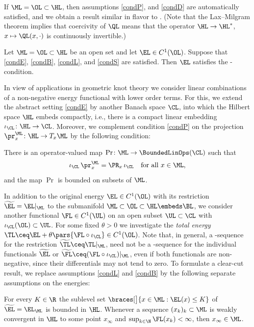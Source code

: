 If $\ML= \OL \subset \HL$,
then assumptions \ref{condP}, and \ref{condD} are automatically satisfied, and we obtain a result similar in flavor to \cite[Chapter~II, Proposition 2.2]{struwe_2008a}. 
(Note that the Lax--Milgram theorem implies that coercivity of $\QL$ means that the operator $\HL \to \HL^*$, $x \mapsto \QL(x,\cdot)$ is continuously invertible.)

\begin{corollary}
\label{cor:PS-open-set}
Let $\ML=\OL \subset \HL$ be an open set and let $\EL\in C^1(\OL)$. 
Suppose that \ref{condE}, \ref{condB}, \ref{condL},  and  \ref{condS} are satisfied.
Then $\EL$ satisfies the \PaSma-condition.
\end{corollary}

In view of applications in geometric knot theory we consider linear 
combinations of a non-negative energy functional with lower order
terms. 
For this, we extend the abstract setting \ref{condE} by another Banach space $\CL$, into which the Hilbert space $\HL$ embeds compactly, i.e., there is a compact linear embedding $\iota_\CL \colon \HL \to \CL$.
Moreover, we complement condition \ref{condP} on the projection $\pr_x^\ML \colon \HL\to T_x\ML$
by the following condition:

\begin{enumerate}
	\Item[\rm (P*)]\label{condP*}
	There is an operator-valued map $\Pr \colon \ML \to \BoundedLinOps(\CL)$
	such that 
	\[
		\iota_\CL \, \pr^{\ML}_x = \PR_x \, \iota_\CL
		\quad 
		\text{for all $x \in \ML$,}
	\]
	and the map $\Pr$ is bounded on \Econtrolled{\EL} subsets of $\ML$.
\end{enumerate}

In addition to the original energy $\EL\in C^1(\OL)$ with its restriction $\widetilde{\EL}=\EL|_\ML$ to the submanifold $\ML\subset\OL\subset\HL \embeds \BL$, 
we
consider another functional $\FL \in C^1(\UL)$ on an open subset $\UL\subset\CL$ with $\iota_\CL(\OL)\subset\UL$.
For some fixed $\theta>0$ we investigate the  \emph{total energy} $\TL \ceq \EL + \theta \pars{\FL \circ \iota_\CL} \in C^1(\OL)$. 
Note that, in general, a \PaSma-sequence  for the restriction $\widetilde{\TL} \ceq \TL|_\ML$, need not be a \PaSma-sequence for the individual
functionals $\widetilde{\EL}$ or $\widetilde{\FL} \ceq (\FL \circ \iota_\CL) |_\ML$, even if
both functionals are non-negative, since their differentials
may not tend to zero. To formulate a clear-cut result,
we replace assumptions \ref{condL} and
\ref{condB} by the following separate  
assumptions on the energies: 
\begin{enumerate}
	\Item[\rm (B*)]\label{condB*}
	For every $K \in \R$ the sublevel set $\braces[\big]{ x \in \ML : \EL(x) \leq K}$ of $\widetilde{\EL} = \EL_\ML$ is bounded in $\HL$.
	\Item[\rm (L*)]\label{condL*}
	Whenever a sequence $(x_k)_k\subset\ML$ is weakly convergent in $\HL$ to some point $x_\infty$ and $ \sup_{k\in\N}\FL(x_k)<\infty $,
	then $x_\infty \in \ML$.	
\end{enumerate}

